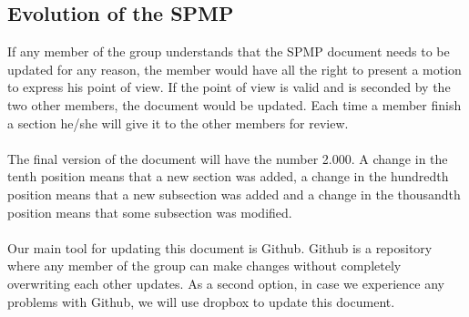 \documentclass[12pt]{article}
\begin{document}
\subsection{Evolution of the SPMP}
If any member of the group understands that the SPMP document needs to be updated for any reason, the member would have all the right to present a motion to express his point of view.  If the point of view is valid and is seconded by the two other members, the document would be updated. Each time a member finish a section he/she will give it to the other members for review.\\\\
The final version of the document will have the number 2.000. A change in the tenth position means that a new section was added, a change in the hundredth position means that a new subsection was added and a change in the thousandth position means that some subsection was modified.\\\\
Our main tool for updating this document is Github. Github is a repository where any member of the group can make changes without completely overwriting each other updates. As a second option, in case we experience any problems with Github, we will use dropbox to update this document.
\end{document}
